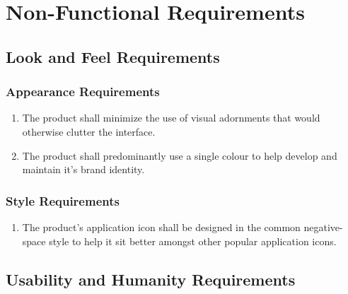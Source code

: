 \documentclass[]{article}
\begin{document}

\section{Non-Functional Requirements}
\label{sec:non-functional_requirements}

\newcommand{\holdEnum}{\setcounter{_enumi}{\value{enumi}}}
\newcommand{\resumeEnum}{\setcounter{enumi}{\value{_enumi}}}

\subsection{Look and Feel Requirements}
\label{sub:look_and_feel_requirements}

\subsubsection{Appearance Requirements}
\label{ssub:appearance_requirements}
\begin{enumerate}[{LF}1. ]
	\item The product shall minimize the use of visual adornments that would otherwise clutter the interface.
	\item The product shall predominantly use a single colour to help develop and maintain it's brand identity.
	\holdEnum
\end{enumerate}

\subsubsection{Style Requirements}
\label{ssub:style_requirements}
\begin{enumerate}[{LF}1.]
	\resumeEnum
	\item The product's application icon shall be designed in the common negative-space style to help it sit better amongst other popular application icons.
\end{enumerate}


\subsection{Usability and Humanity Requirements}
\label{sub:usability_and_humanity_requirements}
\end{document}

